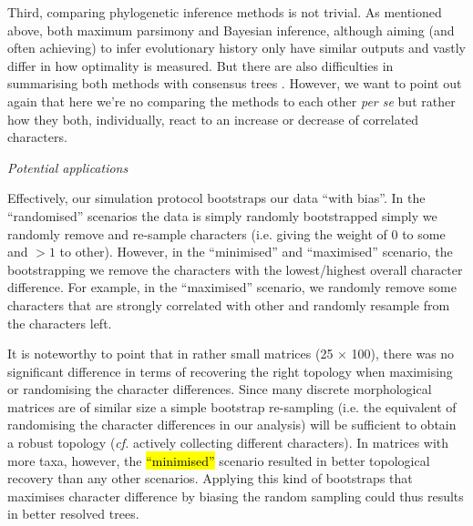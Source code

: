 \documentclass[12pt,letterpaper]{article}
\renewcommand{\subsection}[1]{%
\bigskip
\begin{center}
\begin{large}
\normalfont\itshape #1
\end{large}
\end{center}}
\begin{document}
Third, comparing phylogenetic inference methods is not trivial.
As mentioned above, both maximum parsimony and Bayesian inference, although aiming (and often achieving) to infer evolutionary history only have similar outputs and vastly differ in how optimality is measured.
But there are also difficulties in summarising both methods with consensus trees \cite{oReilly2017efficacy}.
However, we want to point out again that here we're no comparing the methods to each other \textit{per se} but rather how they both, individually, react to an increase or decrease of correlated characters.

\subsection{Potential applications}
Effectively, our simulation protocol bootstraps our data ``with bias''.
In the ``randomised'' scenarios the data is simply randomly bootstrapped simply we randomly remove and re-sample characters (i.e. giving the weight of $0$ to some and $>1$ to other).
However, in the ``minimised'' and ``maximised'' scenario, the bootstrapping we remove the characters with the lowest/highest overall character difference.
For example, in the ``maximised'' scenario, we randomly remove some characters that are strongly correlated with other and randomly resample from the characters left.

It is noteworthy to point that in rather small matrices (25 $\times$ 100), there was no significant difference in terms of recovering the right topology when maximising or randomising the character differences.
Since many discrete morphological matrices are of similar size \citep{guillerme2016assessment} a simple bootstrap re-sampling (i.e. the equivalent of randomising the character differences in our analysis) will be sufficient to obtain a robust topology (\textit{cf.} actively collecting different characters).
In matrices with more taxa, however, the \hl{``minimised''} scenario resulted in better topological recovery than any other scenarios.
Applying this kind of bootstraps that maximises character difference by biasing the random sampling could thus results in better resolved trees.
\end{document}
